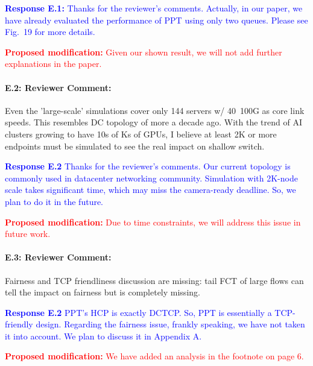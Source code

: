 \documentclass[12pt,one-column]{article}
\begin{document}
\noindent\textcolor{blue}{\textbf{Response E.1:}
Thanks for the reviewer’s comments. 
Actually, in our paper, we have already evaluated the performance of PPT using only two queues. Please see Fig.~19 for more details.
}

\noindent\textcolor{red}{\textbf{Proposed modification: }
Given our shown result, we will not add further explanations in the paper.
}

{\it \paragraph{E.2: Reviewer Comment:} Even the 'large-scale' simulations cover only 144 servers w/ 40~100G as core link speeds. This resembles DC topology of more a decade ago. With the trend of AI clusters growing to have 10s of Ks of GPUs, I believe at least 2K or more endpoints must be simulated to see the real impact on shallow switch.}

\noindent\textcolor{blue}{\textbf{Response E.2}
Thanks for the reviewer’s comments. 
Our current topology is commonly used in datacenter networking community.
Simulation with 2K-node scale takes significant time, which may miss the camera-ready deadline.  So, we plan to do it in the future.
} 

\noindent\textcolor{red}{\textbf{Proposed modification: }
Due to time constraints, we will address this issue in future work.
}

{\it \paragraph{E.3: Reviewer Comment:} Fairness and TCP friendliness discussion are missing: tail FCT of large flows can tell the impact on fairness but is completely missing.}

\noindent\textcolor{blue}{\textbf{Response E.2}
PPT's HCP is exactly DCTCP. So, PPT is essentially a TCP-friendly design.
Regarding the fairness issue, frankly speaking, we have not taken it into account.
We plan to discuss it in Appendix A.
} 

\noindent\textcolor{red}{\textbf{Proposed modification: }
We have added an analysis in the footnote on page 6.
}






%
%
\end{document}
